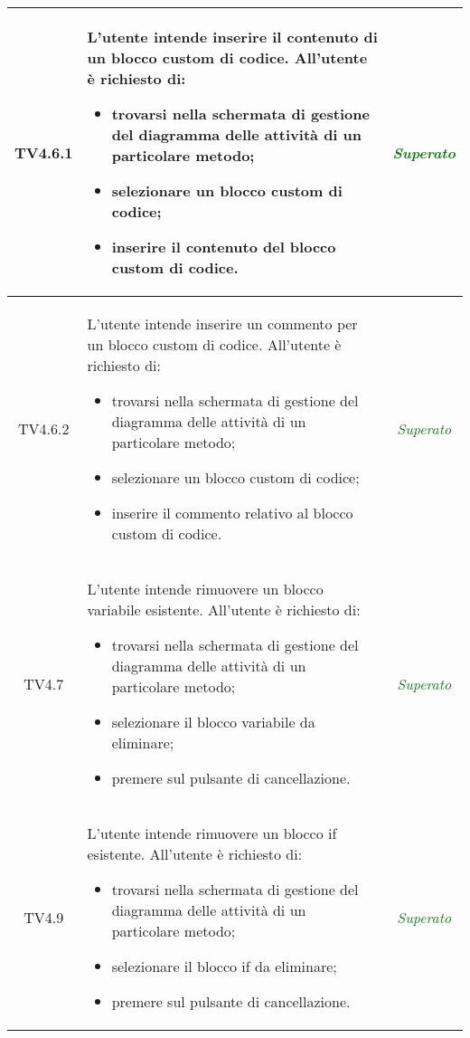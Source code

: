 \begin{longtable}{|c|>{}m{8cm}|c|}
\hypertarget{TV4.6.1}{TV4.6.1} & L'utente intende inserire il contenuto di un blocco custom di codice.
All'utente è richiesto di:
\begin{itemize}
	\item trovarsi nella schermata di gestione del diagramma delle attività di un particolare metodo;
	\item selezionare un blocco custom di codice;
	\item inserire il contenuto del blocco custom di codice.
\end{itemize} & \textcolor{Green}{\textit{Superato}}\\ \hline

\hypertarget{TV4.6.2}{TV4.6.2} & L'utente intende inserire un commento per un blocco custom di codice.
All'utente è richiesto di:
\begin{itemize}
	\item trovarsi nella schermata di gestione del diagramma delle attività di un particolare metodo;
	\item selezionare un blocco custom di codice;
	\item inserire il commento relativo al blocco custom di codice.
\end{itemize} & \textcolor{Green}{\textit{Superato}}\\ \hline

\hypertarget{TV4.7}{TV4.7} & L'utente intende rimuovere un blocco variabile esistente.
All'utente è richiesto di:
\begin{itemize}
	\item trovarsi nella schermata di gestione del diagramma delle attività di un particolare metodo;
	\item selezionare il blocco variabile da eliminare;
	\item premere sul pulsante di cancellazione.
\end{itemize} & \textcolor{Green}{\textit{Superato}}\\ \hline

\hypertarget{TV4.9}{TV4.9} & L'utente intende rimuovere un blocco if esistente.
All'utente è richiesto di:
\begin{itemize}
	\item trovarsi nella schermata di gestione del diagramma delle attività di un particolare metodo;
	\item selezionare il blocco if da eliminare;
	\item premere sul pulsante di cancellazione.
\end{itemize} & \textcolor{Green}{\textit{Superato}}\\ \hline


\end{longtable}
